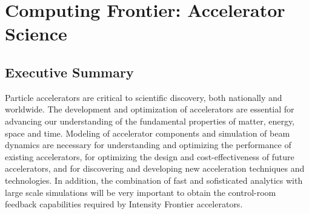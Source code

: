  
\chapter{Computing Frontier: Accelerator Science}
\label{chap:mag}


\begin{center}\begin{boldmath}



\end{boldmath}\end{center}


\section{Executive Summary}
\label{sec:comp-exec}

Particle accelerators are critical to scientific discovery, both nationally and worldwide. The development and optimization of accelerators are essential for advancing our understanding of the fundamental properties of matter, energy, space and time. Modeling of accelerator components and simulation of beam dynamics are necessary for understanding and optimizing the performance of existing accelerators, for optimizing the design and cost-effectiveness of future accelerators, and for discovering and developing new acceleration techniques and technologies.  In addition, the combination of fast and sofisticated analytics with large scale simulations will be very important to obtain the control-room feedback capabilities required by Intensity Frontier accelerators.

